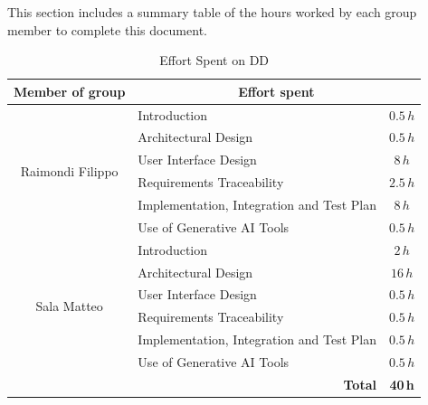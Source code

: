 This section includes a summary table of the hours worked by each group member to complete this document.

\begin{table}[h!]
\centering
\begin{tabular}{c|l|c}
\hline
Member of group & \multicolumn{2}{c}{Effort spent} \\
\hline
\multirow{6}{*}{Raimondi Filippo} 
 & Introduction & $0.5\,h$ \\
 & Architectural Design & $0.5\,h$ \\
 & User Interface Design & $8\,h$ \\
 & Requirements Traceability & $2.5\,h$ \\
 & Implementation, Integration and Test Plan & $8\,h$ \\
 & Use of Generative AI Tools & $0.5\,h$ \\
\hline
\multirow{6}{*}{Sala Matteo} 
 & Introduction & $2\,h$ \\
 & Architectural Design & $16\,h$ \\
 & User Interface Design & $0.5\,h$ \\
 & Requirements Traceability & $0.5\,h$ \\
 & Implementation, Integration and Test Plan & $0.5\,h$ \\
 & Use of Generative AI Tools & $0.5\,h$ \\
\hline
\multicolumn{2}{r|}{\textbf{Total}} & \textbf{40\,h} \\
\hline
\end{tabular}
\caption{Effort Spent on DD}
\end{table}